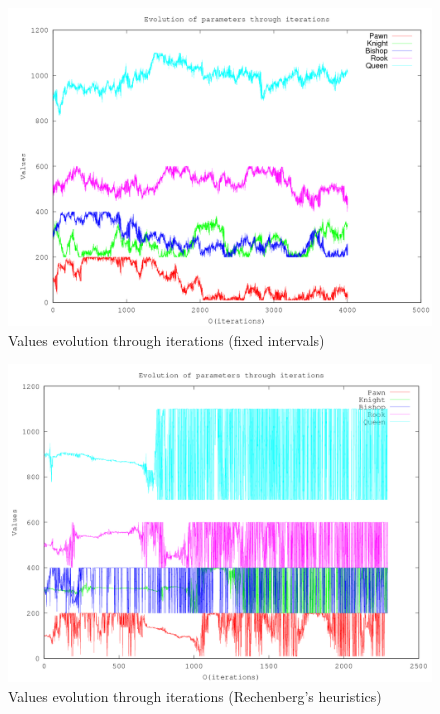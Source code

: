 \documentclass[12pt,a4paper,twocolumn]{article}
\begin{document}
\begin{center}
\begin{figure}
\includegraphics[scale=0.45]{images/history_individuals_3.png}
\caption{Values evolution through iterations (fixed intervals)}
\end{figure}
\end{center}

\begin{center}
\begin{figure}
\includegraphics[scale=0.45]{images/history_individuals_4.png}
\caption{Values evolution through iterations (Rechenberg's heuristics)}
\end{figure}
\end{center}
\end{document}
